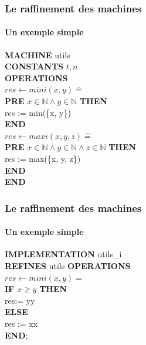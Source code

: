 \documentclass[11pt,a4paper,xcolor=table]{beamer} %
\newcommand{\Bequal}{\mathrel{\widehat{=}}}
\begin{document}
\begin{frame}
\frametitle{Le raffinement des machines}
\framesubtitle{Un exemple simple}
\noindent \textbf{MACHINE} utils \\
\textbf{CONSTANTS} $t,n$ \\
\textbf{OPERATIONS} \\
$res \leftarrow mini(x, y) \Bequal$ \\
\hspace*{1em}  \textbf{PRE} $x \in \mathbb{N} \wedge  y \in \mathbb{N} $ \textbf{THEN} \\
\hspace*{2em} res := min(\{x, y\})  \\
\hspace*{1em} \textbf{END} \\
$res \leftarrow maxi(x, y, z) \Bequal$ \\
\hspace*{1em}  \textbf{PRE} $x \in \mathbb{N} \wedge  y \in \mathbb{N} \wedge z \in \mathbb{N}$ \textbf{THEN} \\
\hspace*{2em} res := max(\{x, y, z\})  \\
\hspace*{1em} \textbf{END} \\
\textbf{END}
\end{frame}

\begin{frame}
\frametitle{Le raffinement des machines}
\framesubtitle{Un exemple simple}
\noindent \textbf{IMPLEMENTATION}  utils\_i \\
\textbf{REFINES} utils
\textbf{OPERATIONS} \\
$res \leftarrow mini ( x , y ) =$ \\
\hspace*{1em}    \textbf{IF}  $x \geq y$ \textbf{THEN} \\
\hspace*{2em}        res:= yy \\
\hspace*{1em}    \textbf{ELSE} \\
\hspace*{2em}        res := xx \\
\hspace*{1em}    \textbf{END}; \\
\end{frame}
\end{document}
